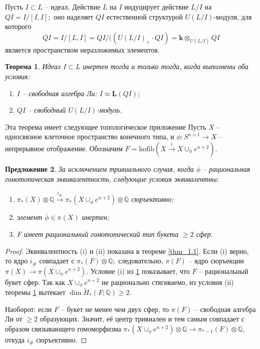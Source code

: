 \documentclass[10pt,a4paper]{article}
\def\QQ{\mathbb{Q}}
\def\L{\mathbf{L}}
\def\k{\mathbf{k}}
\newtheorem{thm}{Теорема}[section]
\newtheorem{prp}[thm]{Предложение}
\theoremstyle{definition}
\begin{document}
Пусть $I\subset L$ -- идеал. Действие $L$ на $I$ индуцирует действие $L/I$ на $QI=I/[I,I];$ оно наделяет $QI$ естественной структурой $U(L/I)$-модуля, для которого
$$\overline{Q}I=I/[L,I]=QI/((U(L/I)_+\cdot QI)=\k\otimes_{U(L/I)}QI$$ является пространством неразложимых элементов.
\begin{thm}\label{thm_3.3}
Идеал $I\subset L$ инертен тогда и только тогда, когда выполнены оба условия:
\begin{enumerate}
\item[(i)] $I$ -- свободная алгебра Ли: $I\simeq \L(QI);$
\item[(ii)] $QI$ -- свободный $U(L/I)$-модуль.
\end{enumerate}
\end{thm}
Эта теорема имеет следующее топологическое приложение Пусть $X$ -- односвязное клеточное пространство конечного типа, и $\phi:S^{n+1}\to X$ -- непрерывное отображение. Обозначим $F=\mathrm{hofib}(X\overset{i}{\longrightarrow} X\cup_\phi e^{n+2}).$
\begin{prp}\label{prp_3.4}
За исключением тривиального случая, когда $\phi$ -- рациональная гомотопическая эквивалентность, следующие условия эквивалентны:
\begin{enumerate}
\item[(i)] $\pi_*(X)\otimes\QQ \overset{i_{\#}}{\longrightarrow} \pi_*(X\cup_\phi e^{n+2})\otimes\QQ$ сюръективно;
\item[(ii)] элемент $\overline{\phi}\in\pi(X)$ инертен;
\item[(iii)] $F$ имеет рациональный гомотопический тип букета $\ge 2$ сфер.
\end{enumerate}
\end{prp}
\begin{proof}
Эквивалентность (i) и (ii) показана в теореме \ref{thm_1.1}. Если (i) верно, то ядро $i_\#$ совпадает с $\pi_*(F)\otimes \QQ;$ следовательно, $\pi(F)$ -- ядро сюръекции $\pi(X)\to \pi(X\cup_\phi e^{n+2}).$ Условие (i) из \ref{thm_3.3} показывает, что $F$ -- рациональный букет сфер. Так как $X\cup_\phi e^{n+2}$ не рационально стягиваемо, из условия (ii) теоремы \ref{thm_3.3} вытекает $\dim \widetilde{H}_*(F;\QQ)\ge 2.$

Наоборот: если $F$ -- букет не менее чем двух сфер, то $\pi(F)$ -- свободная алгебра Ли от $\ge 2$ образующих. Значит, её центр тривиален и тем самым совпадает с образом связывающего гомоморфизма $\pi_*(X\cup_\phi e^{n+2})\otimes\QQ\to \pi_{*-1}(F)\otimes \QQ,$ откуда $i_\#$ сюръективно.
\end{proof}
\end{document}
